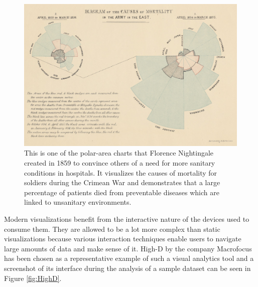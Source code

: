 \begin{figure}[tp]
    \centering
    \includegraphics[keepaspectratio,width=\linewidth,height=\fullh / 3]
    {images/nightingale.png}
    \caption[Polar-Area Chart by Florence Nightingale From 1859]{
        This is one of the polar-area charts that Florence Nightingale created in 1859 to convince others of a need for more sanitary conditions in hospitals. It visualizes the causes of mortality for soldiers during the Crimean War and demonstrates that a large percentage of patients died from preventable diseases which are linked to unsanitary environments.
    }
    \label{fig:NightingalePolarAreaChart}
\end{figure}

Modern visualizations benefit from the interactive nature of the devices used to consume them. They are allowed to be a lot more complex than static visualizations because various interaction techniques enable users to navigate large amounts of data and make sense of it. High-D by the company Macrofocus \parencite{HighD} has been chosen as a representative example of such a visual analytics tool and a screenshot of its interface during the analysis of a sample dataset can be seen in Figure \ref{fig:HighD}.

